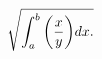 \documentclass[preview]{standalone}
\begin{document}
\begin{align*}
\sqrt{ \int_ {a}^ {b} {\left( {x \over y} \right)} d x .}
\end{align*}
\end{document}
